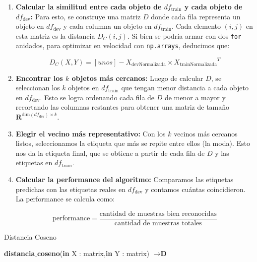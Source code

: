 \begin{enumerate}
    \item \textbf{Calcular la similitud entre cada objeto de $df_{\text{train}}$ y cada objeto de $df_{\text{dev}}$:} Para esto, se construye una matriz $D$ donde cada fila representa un objeto en $df_{\text{dev}}$ y cada columna un objeto en $df_{\text{train}}$. Cada elemento $(i, j)$ en esta matriz es la distancia $D_{C}(i, j)$. Si bien se podría armar con dos \texttt{for} anidados, para optimizar en velocidad con \texttt{np.arrays}, deducimos que:

    \[
    D_{C}(X,Y) = [unos] - X_{\text{devNormalizada}} \times {X_{\text{trainNormalizada}}}^T
    \]


    \item \textbf{Encontrar los $k$ objetos más cercanos:} Luego de calcular $D$, se seleccionan los $k$ objetos en $df_{\text{train}}$ que tengan menor distancia a cada objeto en $df_{\text{dev}}$. Esto se logra ordenando cada fila de $D$ de menor a mayor y recortando las columnas restantes para obtener una matriz de tamaño $\mathbf{R}^{\text{dim}(df_{\text{dev}}) \times k}$.

    \item \textbf{Elegir el vecino más representativo:} Con los $k$ vecinos más cercanos listos, seleccionamos la etiqueta que más se repite entre ellos (la moda). Esto nos da la etiqueta final, que se obtiene a partir de cada fila de $D$ y las etiquetas en $df_{\text{train}}$.

    \item \textbf{Calcular la performance del algoritmo:} Comparamos las etiquetas predichas con las etiquetas reales en $df_{\text{dev}}$ y contamos cuántas coincidieron. La performance se calcula como:

    \[
    \text{performance} = \frac{\text{cantidad de muestras bien reconocidas}}{\text{cantidad de muestras totales}}
    \]
\end{enumerate}



\begin{algorithm}
\caption{Distancia Coseno}\label{dist_cos}
\begin{algorithmic}
\State \textbf{distancia$\_$coseno}(\textbf{in} X : matrix,\textbf{in} Y : matrix) $\to \textbf{D}$
 


    

\end{algorithmic}
\end{algorithm}


